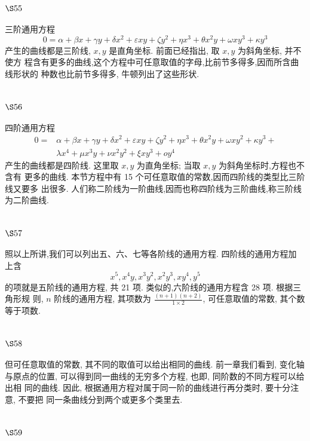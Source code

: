 \section{$\S 55$}

三阶通用方程
\[
0=\alpha+\beta x+\gamma y+\delta x^{2}+\varepsilon x y+\zeta y^{2}+\eta x^{3}+\theta x^{2} y+\omega x y^{3}+\kappa y^{3}
\]
产生的曲线都是三阶线, $x, y$ 是直角坐标. 前面已经指出, 取 $x, y$ 为斜角坐标, 并不使方 程含有更多的曲线,这个方程中可任意取值的字母,比前节多得多,因而所含曲线形状的 种数也比前节多得多, 牛顿列出了这些形状.

\section{$\S 56$}

四阶通用方程
\[
\begin{aligned}
0= & \alpha+\beta x+\gamma y+\delta x^{2}+\varepsilon x y+\zeta y^{2}+\eta x^{3}+\theta x^{2} y+\omega x y^{2}+\kappa y^{3}+ \\
& \lambda x^{4}+\mu x^{3} y+\nu x^{2} y^{2}+\xi x y^{3}+o y^{4}
\end{aligned}
\]
产生的曲线都是四阶线. 这里取 $x, y$ 为直角坐标; 当取 $x, y$ 为斜角坐标时,方程也不含有 更多的曲线. 本节方程中有 15 个可任意取值的常数,因而四阶线的类型比三阶线又要多 出很多. 人们称二阶线为一阶曲线,因而也称四阶线为三阶曲线,称三阶线为二阶曲线.

\section{$\S 57$}

照以上所讲,我们可以列出五、六、七等各阶线的通用方程. 四阶线的通用方程加 上含
\[
x^{5}, x^{4} y, x^{3} y^{2}, x^{2} y^{3}, x y^{4}, y^{5}
\]
的项就是五阶线的通用方程, 共 21 项. 类似的,六阶线的通用方程含 28 项. 根据三角形规 则, $n$ 阶线的通用方程, 其项数为 $\frac{(n+1)(n+2)}{1 \times 2}$, 可任意取值的常数, 其个数等于项数.

\section{$\S 58$}

但可任意取值的常数, 其不同的取值可以给出相同的曲线. 前一章我们看到, 变化轴与原点的位置, 可以得到同一曲线的无穷多个方程, 也即, 同阶数的不同方程可以给出相 同的曲线. 因此, 根据通用方程对属于同一阶的曲线进行再分类时, 要十分注意, 不要把 同一条曲线分到两个或更多个类里去.

\section{$\S 59$}

